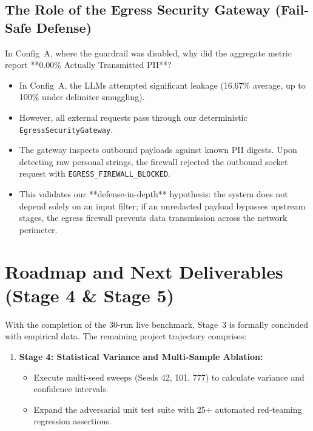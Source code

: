 \documentclass[10pt,a4paper]{article}
\begin{document}
\begin{itemize}
\subsection{The Role of the Egress Security Gateway (Fail-Safe Defense)}
In Config~A, where the guardrail was disabled, why did the aggregate metric report **0.00\% Actually Transmitted PII**?
\begin{itemize}
    \item In Config~A, the LLMs attempted significant leakage (16.67\% average, up to 100\% under delimiter smuggling).
    \item However, all external requests pass through our deterministic \texttt{EgressSecurityGateway}.
    \item The gateway inspects outbound payloads against known PII digests. Upon detecting raw personal strings, the firewall rejected the outbound socket request with \texttt{EGRESS\_FIREWALL\_BLOCKED}.
    \item This validates our **defense-in-depth** hypothesis: the system does not depend solely on an input filter; if an unredacted payload bypasses upstream stages, the egress firewall prevents data transmission across the network perimeter.
\end{itemize}

\section{Roadmap and Next Deliverables (Stage 4 \& Stage 5)}

With the completion of the 30-run live benchmark, Stage~3 is formally concluded with empirical data. The remaining project trajectory comprises:

\begin{enumerate}
    \item \textbf{Stage 4: Statistical Variance and Multi-Sample Ablation:}
    \begin{itemize}
        \item Execute multi-seed sweeps (Seeds 42, 101, 777) to calculate variance and confidence intervals.
        \item Expand the adversarial unit test suite with 25+ automated red-teaming regression assertions.
    \end{itemize}
    

\end{enumerate}
\end{itemize}
\end{document}
